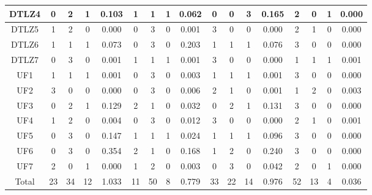 \begin{table*}[t]
\begin{tabular}{c|c|c|c|c|c|c|c|c|c|c|c|c|c|c|c|c|}
\multicolumn{1}{|c|}{DTLZ4} & 0 & 2 & 1 & 0.103 & 1 & 1 & 1 & 0.062 & 0 & 0 & 3 & 0.165 & 2 & 0 & 1 & 0.000 \\ \hline
\multicolumn{1}{|c|}{DTLZ5} & 1 & 2 & 0 & 0.000 & 0 & 3 & 0 & 0.001 & 3 & 0 & 0 & 0.000 & 2 & 1 & 0 & 0.000 \\ \hline
\multicolumn{1}{|c|}{DTLZ6} & 1 & 1 & 1 & 0.073 & 0 & 3 & 0 & 0.203 & 1 & 1 & 1 & 0.076 & 3 & 0 & 0 & 0.000 \\ \hline
\multicolumn{1}{|c|}{DTLZ7} & 0 & 3 & 0 & 0.001 & 1 & 1 & 1 & 0.001 & 3 & 0 & 0 & 0.000 & 1 & 1 & 1 & 0.001 \\ \hline
\multicolumn{1}{|c|}{UF1} & 1 & 1 & 1 & 0.001 & 0 & 3 & 0 & 0.003 & 1 & 1 & 1 & 0.001 & 3 & 0 & 0 & 0.000 \\ \hline
\multicolumn{1}{|c|}{UF2} & 3 & 0 & 0 & 0.000 & 0 & 3 & 0 & 0.006 & 2 & 1 & 0 & 0.001 & 1 & 2 & 0 & 0.003 \\ \hline
\multicolumn{1}{|c|}{UF3} & 0 & 2 & 1 & 0.129 & 2 & 1 & 0 & 0.032 & 0 & 2 & 1 & 0.131 & 3 & 0 & 0 & 0.000 \\ \hline
\multicolumn{1}{|c|}{UF4} & 1 & 2 & 0 & 0.004 & 0 & 3 & 0 & 0.012 & 3 & 0 & 0 & 0.000 & 2 & 1 & 0 & 0.001 \\ \hline
\multicolumn{1}{|c|}{UF5} & 0 & 3 & 0 & 0.147 & 1 & 1 & 1 & 0.024 & 1 & 1 & 1 & 0.096 & 3 & 0 & 0 & 0.000 \\ \hline
\multicolumn{1}{|c|}{UF6} & 0 & 3 & 0 & 0.354 & 2 & 1 & 0 & 0.168 & 1 & 2 & 0 & 0.240 & 3 & 0 & 0 & 0.000 \\ \hline
\multicolumn{1}{|c|}{UF7} & 2 & 0 & 1 & 0.000 & 1 & 2 & 0 & 0.003 & 0 & 3 & 0 & 0.042 & 2 & 0 & 1 & 0.000 \\ \hline
\multicolumn{1}{|c|}{Total} & 23 & 34 & 12 & 1.033 & 11 & 50 & 8 & 0.779 & 33 & 22 & 14 & 0.976 & 52 & 13 & 4 & 0.036 \\ \hline
\end{tabular}%
\end{table*}

